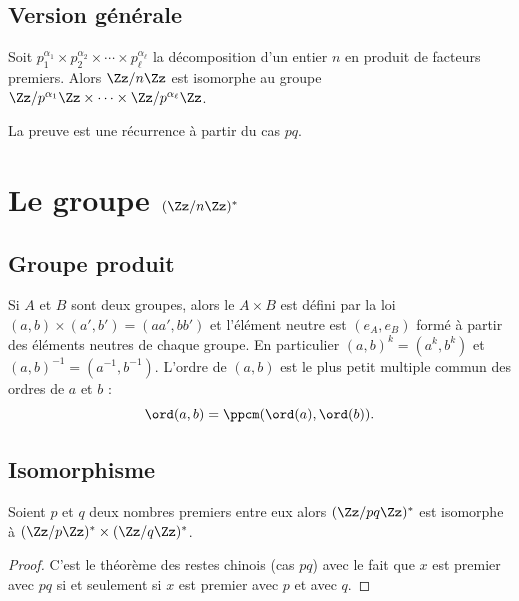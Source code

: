 \documentclass[11pt,class=report,crop=false]{standalone}
\begin{document}
\subsection{Version générale}

\begin{theoreme}
Soit $p_1^{\alpha_1} \times p_2^{\alpha_2} \times \cdots \times p_\ell^{\alpha_\ell}$ la décomposition d'un entier $n$ en produit de facteurs premiers.
Alors $\Zz/n\Zz$ est isomorphe au groupe
$\Zz/p^{\alpha_1}\Zz \times \cdots \times  \Zz/p^{\alpha_\ell}\Zz$.
\end{theoreme}

La preuve est une récurrence à partir du cas $pq$.



\section{Le groupe $(\Zz/n\Zz)^*$}
\subsection{Groupe produit}

Si $A$ et $B$ sont deux groupes, alors le  $A \times B$ est défini par la loi $(a,b)\times (a',b') = (aa',bb')$ et l'élément neutre est $(e_A,e_B)$ formé à partir des éléments neutres de chaque groupe.
En particulier $(a,b)^k = (a^k,b^k)$ et $(a,b)^{-1} = (a^{-1},b^{-1})$.
L'ordre de $(a,b)$ est le plus petit multiple commun des ordres de $a$ et $b$ :
$$\ord(a,b) = \ppcm( \ord(a), \ord(b) ).$$


\subsection{Isomorphisme}


\begin{proposition}
Soient $p$ et $q$ deux nombres premiers entre eux alors
$(\Zz/ pq \Zz)^*$ est isomorphe à $(\Zz/p\Zz)^* \times (\Zz/q\Zz)^*$.
\end{proposition}

\begin{proof}
C'est le théorème des restes chinois (cas $pq$) avec le fait que $x$ est premier avec $pq$ si et seulement si $x$ est premier avec $p$ et avec $q$.
\end{proof}
\end{document}
